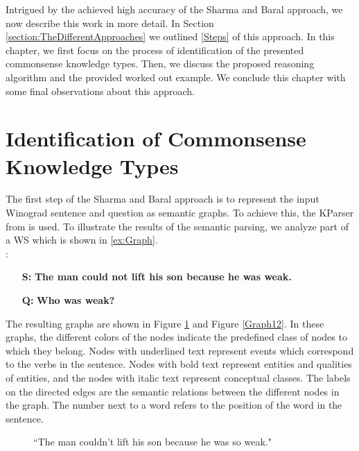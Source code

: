 \label{knowledge_types}
Intrigued by the achieved high accuracy of the Sharma and Baral \cite{2018CommonsenseKT} approach, we now describe this work in more detail. In Section \ref{section:TheDifferentApproaches} we outlined \ref{Steps} of this approach. In this chapter, we first focus on the process of identification of the presented commonsense knowledge types. Then, we discuss the proposed reasoning algorithm and the provided worked out example. We conclude this chapter with some final observations about this approach.


\section{Identification of Commonsense Knowledge Types}
The first step of the Sharma and Baral \cite{2018CommonsenseKT} approach is to represent the input Winograd sentence and question as semantic graphs. To achieve this, the KParser from \cite{DBLP:conf/ijcai/SharmaVAB15} is used. 
To illustrate the results of the semantic parsing, we analyze part of a WS which is shown in \ref{ex:Graph}.  \\ 
:
\begin{itemize}
	\item[\textbf{S:}] \textbf{The man could not lift his son because he was weak.}
	\item[\textbf{Q:}] \textbf{Who was weak?}
\end{itemize}

The  resulting graphs are shown in Figure \ref{Graph11} and Figure \ref{Graph12}.
In these graphs, the different colors of the nodes indicate the predefined class of nodes to which they belong. 
Nodes with underlined text represent events which correspond to the verbs in the sentence. Nodes with bold text represent entities and qualities of entities, and the nodes with italic text represent conceptual classes. The labels on the directed edges are the semantic relations between the different nodes in the graph. The number next to a word refers to the position of the word in the sentence. 
\begin{figure} [h!]
	\centering
	
	\caption{\label{Graph11}``The man couldn't lift his son because he was so weak."}
\end{figure}


